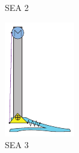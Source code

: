 \begin{figure}[hb!]
\begin{subfigure}{.19\textwidth}
    \caption{SEA 2}
    \label{fig:series2}
  \end{subfigure}
  \begin{subfigure}{.19\textwidth}
    \centering
    \includegraphics[width=\linewidth]{figures/illustration_serial_direct_ii.pdf}
    \caption{SEA 3}
    \label{fig:series3}
  \end{subfigure}
  \begin{subfigure}{.19\textwidth}
    \centering

\end{subfigure}
\end{figure}
